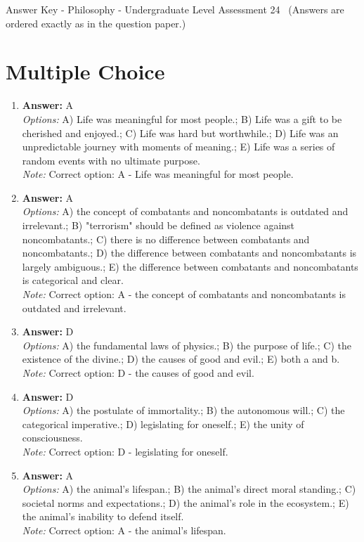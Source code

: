 \documentclass[12pt]{article}
\begin{document}
\begin{center}
Answer Key - Philosophy - Undergraduate Level Assessment 24 \
\small (Answers are ordered exactly as in the question paper.)
\end{center}

\section*{Multiple Choice}
\begin{enumerate}[label=\arabic*.]
\item \textbf{Answer:} A
\\ \textit{Options:} A) Life was meaningful for most people.; B) Life was a gift to be cherished and enjoyed.; C) Life was hard but worthwhile.; D) Life was an unpredictable journey with moments of meaning.; E) Life was a series of random events with no ultimate purpose.
\\ \textit{Note:} Correct option: A - Life was meaningful for most people.
\item \textbf{Answer:} A
\\ \textit{Options:} A) the concept of combatants and noncombatants is outdated and irrelevant.; B) "terrorism" should be defined as violence against noncombatants.; C) there is no difference between combatants and noncombatants.; D) the difference between combatants and noncombatants is largely ambiguous.; E) the difference between combatants and noncombatants is categorical and clear.
\\ \textit{Note:} Correct option: A - the concept of combatants and noncombatants is outdated and irrelevant.
\item \textbf{Answer:} D
\\ \textit{Options:} A) the fundamental laws of physics.; B) the purpose of life.; C) the existence of the divine.; D) the causes of good and evil.; E) both a and b.
\\ \textit{Note:} Correct option: D - the causes of good and evil.
\item \textbf{Answer:} D
\\ \textit{Options:} A) the postulate of immortality.; B) the autonomous will.; C) the categorical imperative.; D) legislating for oneself.; E) the unity of consciousness.
\\ \textit{Note:} Correct option: D - legislating for oneself.
\item \textbf{Answer:} A
\\ \textit{Options:} A) the animal's lifespan.; B) the animal's direct moral standing.; C) societal norms and expectations.; D) the animal's role in the ecosystem.; E) the animal's inability to defend itself.
\\ \textit{Note:} Correct option: A - the animal's lifespan.
\end{enumerate}
\end{document}
